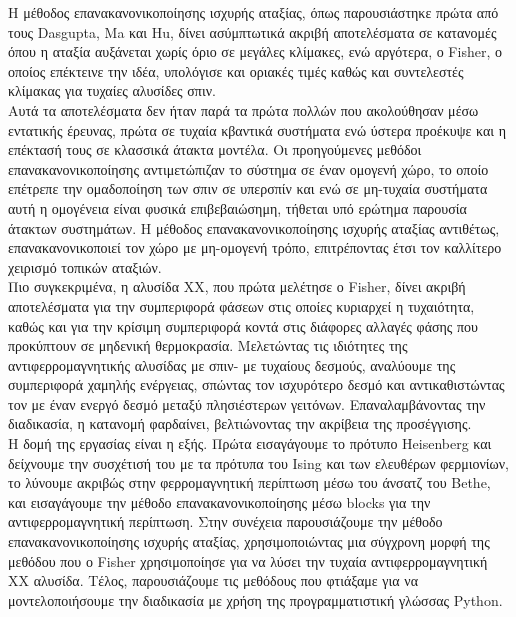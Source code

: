 \documentclass[../main.tex]{subfiles}
\begin{document}
Η μέθοδος επανακανονικοποίησης ισχυρής αταξίας, όπως παρουσιάστηκε πρώτα από τους Dasgupta, Ma και Hu, δίνει ασύμπτωτικά ακριβή αποτελέσματα σε κατανομές όπου η αταξία αυξάνεται χωρίς όριο σε μεγάλες κλίμακες, ενώ αργότερα, ο Fisher, ο οποίος επέκτεινε την ιδέα, υπολόγισε και οριακές τιμές καθώς και συντελεστές κλίμακας για τυχαίες αλυσίδες σπιν.\\

Αυτά τα αποτελέσματα δεν ήταν παρά τα πρώτα πολλών που ακολούθησαν μέσω εντατικής έρευνας, πρώτα σε τυχαία κβαντικά συστήματα ενώ ύστερα προέκυψε και η επέκτασή τους σε κλασσικά άτακτα μοντέλα. Οι προηγούμενες μεθόδοι επανακανονικοποίησης αντιμετώπιζαν το σύστημα σε έναν ομογενή χώρο, το οποίο επέτρεπε την ομαδοποίηση των σπιν σε υπερσπίν και ενώ σε μη-τυχαία συστήματα αυτή η ομογένεια είναι φυσικά επιβεβαιώσημη, τήθεται υπό ερώτημα παρουσία άτακτων συστημάτων. Η μέθοδος επανακανονικοποίησης ισχυρής αταξίας αντιθέτως, επανακανονικοποιεί τον χώρο με μη-ομογενή τρόπο, επιτρέποντας έτσι τον καλλίτερο χειρισμό τοπικών αταξιών.\\

Πιο συγκεκριμένα, η αλυσίδα XX, που πρώτα μελέτησε ο Fisher, δίνει ακριβή αποτελέσματα για την συμπεριφορά φάσεων στις οποίες κυριαρχεί η τυχαιότητα, καθώς και για την κρίσιμη συμπεριφορά κοντά στις διάφορες αλλαγές φάσης που προκύπτουν σε μηδενική θερμοκρασία. Μελετώντας τις ιδιότητες της αντιφερρομαγνητικής αλυσίδας με σπιν- με τυχαίους δεσμούς, αναλύουμε της συμπεριφορά χαμηλής ενέργειας, σπώντας τον ισχυρότερο δεσμό και αντικαθιστώντας τον με έναν ενεργό δεσμό μεταξύ πλησιέστερων γειτόνων. Επαναλαμβάνοντας την διαδικασία, η κατανομή φαρδαίνει, βελτιώνοντας την ακρίβεια της προσέγγισης.\\

Η δομή της εργασίας είναι η εξής. Πρώτα εισαγάγουμε το πρότυπο Heisenberg και δείχνουμε την συσχέτισή του με τα πρότυπα του Ising και των ελευθέρων φερμιονίων, το λύνουμε ακριβώς στην φερρομαγνητική περίπτωση μέσω του άνσατζ του Bethe, και εισαγάγουμε την μέθοδο επανακανονικοποίησης μέσω blocks για την αντιφερρομαγνητική περίπτωση. Στην συνέχεια παρουσιάζουμε την μέθοδο επανακανονικοποίησης ισχυρής αταξίας, χρησιμοποιώντας μια σύγχρονη μορφή της μεθόδου που ο Fisher χρησιμοποίησε για να λύσει την τυχαία αντιφερρομαγνητική XX αλυσίδα. Τέλος, παρουσιάζουμε τις μεθόδους που φτιάξαμε για να μοντελοποιήσουμε την διαδικασία με χρήση της προγραμματιστική γλώσσας Python.
\end{document}
